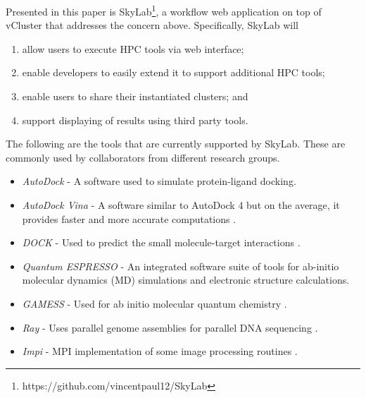 Presented in this paper is SkyLab\footnote{https://github.com/vincentpaul12/SkyLab}, a workflow web application on top of vCluster that addresses the concern above. Specifically, SkyLab will  

\begin{enumerate}
	\item allow users to execute HPC tools via web interface; 
	\item enable developers to easily extend it to support additional HPC tools;
	\item enable users to share their instantiated clusters; and
	\item support displaying of results using third party tools.
\end{enumerate}
   
The following are the tools that are currently supported by SkyLab. These are commonly used by collaborators from different research groups.

\begin{itemize}
    	\item \textit{AutoDock} - A software used to simulate protein-ligand docking\cite{morris2009autodock4}.

        \item \textit{AutoDock Vina} - A software similar to AutoDock 4 but on the average, it provides faster and more accurate computations \cite{JCC:JCC21334}. 
            
		\item \textit{DOCK} - Used to predict the small molecule-target interactions    \cite{lang2009dock}.
            
      	\item \textit{Quantum ESPRESSO} - An integrated software suite of tools for ab-initio molecular dynamics (MD) simulations and electronic structure calculations\cite{QE-2009}.

  		\item \textit{GAMESS} - Used for ab initio molecular quantum chemistry  \cite{1993gamess}.
            
 	    \item \textit{Ray} - Uses parallel genome assemblies for parallel DNA sequencing \cite{boisvert_ray_2012}.
 	    
 	    \item \textit{Impi} - MPI implementation of some image processing routines \cite{trajano2010}. 

\end{itemize}   

